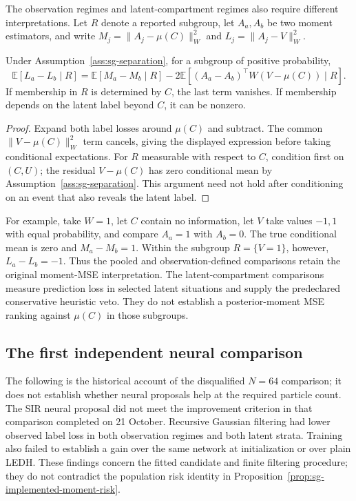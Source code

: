 The observation regimes and latent-compartment regimes also require different
interpretations. Let \(R\) denote a reported subgroup, let
\(A_a,A_b\) be two moment estimators, and write
\(M_j=\|A_j-\mu(C)\|_W^2\) and \(L_j=\|A_j-V\|_W^2\).
\begin{proposition}
\label{prop:sg-subgroup-risk}
Under Assumption~\ref{ass:sg-separation}, for a subgroup of positive probability,
\[
 \mathbb E[L_a-L_b\mid R]
 =\mathbb E[M_a-M_b\mid R]
 -2\mathbb E[(A_a-A_b)^\top W(V-\mu(C))\mid R].
\]
If membership in \(R\) is determined by \(C\), the last term vanishes.
If membership depends on the latent label beyond \(C\), it can be nonzero.
\end{proposition}
\begin{proof}
Expand both label losses around \(\mu(C)\) and subtract. The common
\(\|V-\mu(C)\|_W^2\) term cancels, giving the displayed expression before
taking conditional expectations. For \(R\) measurable with respect to \(C\),
condition first on \((C,U)\); the residual \(V-\mu(C)\) has zero conditional
mean by Assumption~\ref{ass:sg-separation}. This argument need not hold after
conditioning on an event that also reveals the latent label.
\end{proof}
For example, take \(W=1\), let \(C\) contain no information, let \(V\) take values
\(-1,1\) with equal probability, and compare \(A_a=1\) with \(A_b=0\).
The true conditional mean is zero and \(M_a-M_b=1\). Within the subgroup
\(R=\{V=1\}\), however, \(L_a-L_b=-1\). Thus the pooled and
observation-defined comparisons retain the original moment-MSE interpretation.
The latent-compartment comparisons measure prediction loss in selected latent
situations and supply the predeclared conservative heuristic veto. They do not
establish a posterior-moment MSE ranking against \(\mu(C)\) in those subgroups.

\subsection{The first independent neural comparison}
\label{sec:sg-neural-result}

The following is the historical account of the disqualified $N=64$ comparison;
it does not establish whether neural proposals help at the required particle
count. The SIR neural proposal did not meet the improvement criterion in that
comparison completed on 21 October. Recursive Gaussian filtering
had lower observed label loss in both observation regimes and both latent
strata. Training also failed to establish a gain over the same network at
initialization or over plain LEDH. These findings concern the fitted candidate
and finite filtering procedure; they do not contradict the population risk
identity in Proposition~\ref{prop:sg-implemented-moment-risk}.

